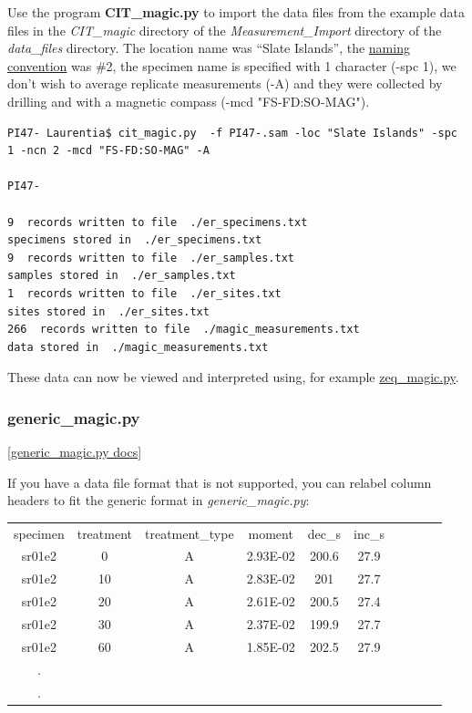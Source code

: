 \documentclass[11pt]{book}
\begin{document}
{{{{Use the program {\bf CIT\_magic.py} to import the data files from the example data files in the {\it CIT\_magic} directory of the {\it Measurement\_Import} directory of the {\it data\_files} directory.   The location name was ``Slate Islands'', the \href{#naming_schemes}{naming convention} was \#2, the specimen name is specified with 1 character (-spc 1), we don't wish to average replicate measurements (-A) and they were collected by drilling and with a magnetic compass (-mcd "FS-FD:SO-MAG").

\begin{verbatim}
PI47- Laurentia$ cit_magic.py  -f PI47-.sam -loc "Slate Islands" -spc 1 -ncn 2 -mcd "FS-FD:SO-MAG" -A

PI47-

9  records written to file  ./er_specimens.txt
specimens stored in  ./er_specimens.txt
9  records written to file  ./er_samples.txt
samples stored in  ./er_samples.txt
1  records written to file  ./er_sites.txt
sites stored in  ./er_sites.txt
266  records written to file  ./magic_measurements.txt
data stored in  ./magic_measurements.txt
\end{verbatim}

These data can now be viewed and interpreted using, for example \href{#zeq_magic.py}{zeq\_magic.py}.


\subsubsection{generic\_magic.py}
\href{https://github.com/PmagPy/PmagPy/blob/master/programs/generic_magic.py}{[generic\_magic.py docs]}

If you have a data file format that is not supported, you can relabel column headers to fit the generic format in {\it generic\_magic.py}:

\begin{tabular}{cccccccccc}
specimen & treatment & treatment\_type & moment & dec\_s & inc\_s \\
sr01e2 & 0 & A & 2.93E-02 & 200.6 & 27.9 \\
sr01e2 & 10 & A & 2.83E-02 & 201 & 27.7 \\
sr01e2 & 20 & A & 2.61E-02 & 200.5 & 27.4 \\
sr01e2 & 30 & A & 2.37E-02 & 199.9 & 27.7 \\
sr01e2 & 60 & A & 1.85E-02 & 202.5 & 27.9 \\
.\\
.\\
\end{tabular}

}}}}
\end{document}

